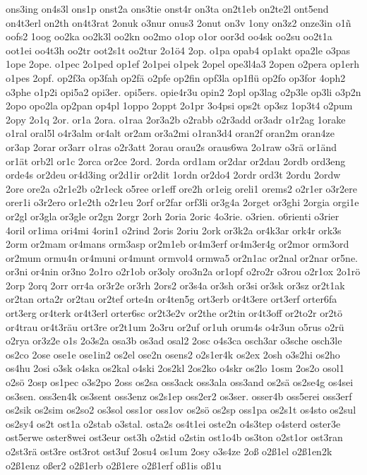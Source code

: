 {ons3ing
on4s3l
ons1p
onst2a
ons3tie
onst4r
on3ta
on2t1eb
on2te2l
ont5end
on4t3erl
on2th
on4t3rat
2onuk
o3nur
onus3
2onut
on3v
1ony
on3z2
onze3in
o1ñ
oofs2
1oog
oo2ka
oo2k3l
oo2kn
oo2mo
o1op
o1or
oor3d
oo4sk
oo2su
oo2t1a
oot1ei
oo4t3h
oo2tr
oot2s1t
oo2tur
2o1ö4
2op.
o1pa
opab4
op1akt
opa2le
o3pas
1ope
2ope.
o1pec
2o1ped
op1ef
2o1pei
o1pek
2opel
ope3l4a3
2open
o2pera
op1erh
o1pes
2opf.
op2f3a
op3fah
op2fä
o2pfe
op2fin
opf3la
op1flü
op2fo
op3for
4oph2
o3phe
o1p2i
opi5a2
opi3er.
opi5ers.
opie4r3u
opin2
2opl
op3lag
o2p3le
op3li
o3p2n
2opo
opo2la
op2pan
op4pl
1oppo
2oppt
2o1pr
3o4psi
ops2t
op3sz
1op3t4
o2pum
2opy
2o1q
2or.
or1a
2ora.
o1raa
2or3a2b
o2rabb
o2r3add
or3adr
o1r2ag
1orake
o1ral
oral5l
o4r3alm
or4alt
or2am
or3a2mi
o1ran3d4
oran2f
oran2m
oran4ze
or3ap
2orar
or3arr
o1ras
o2r3att
2orau
orau2s
oraus6wa
2o1raw
o3rä
or1änd
or1ät
orb2l
or1c
2orca
or2ce
2ord.
2orda
ord1am
or2dar
or2dau
2ordb
ord3eng
orde4s
or2deu
or4d3ing
or2d1ir
or2dit
1ordn
or2do4
2ordr
ord3t
2ordu
2ordw
2ore
ore2a
o2r1e2b
o2r1eck
o5ree
or1eff
ore2h
or1eig
oreli1
orems2
o2r1er
o3r2ere
orer1i
o3r2ero
or1e2th
o2r1eu
2orf
or2far
orf3li
or3g4a
2orget
or3ghi
2orgia
orgi1e
or2gl
or3gla
or3gle
or2gn
2orgr
2orh
2oria
2oric
4o3rie.
o3rien.
o6rienti
o3rier
4oril
or1ima
ori4mi
4orin1
o2rind
2oris
2oriu
2ork
or3k2a
or4k3ar
ork4r
ork3s
2orm
or2mam
or4mans
orm3asp
or2m1eb
or4m3erf
or4m3er4g
or2mor
orm3ord
or2mum
ormu4n
or4muni
or4munt
ormvol4
ormwa5
or2n1ac
or2nal
or2nar
or5ne.
or3ni
or4nin
or3no
2o1ro
o2r1ob
or3oly
oro3n2a
or1opf
o2ro2r
o3rou
o2r1ox
2o1rö
2orp
2orq
2orr
orr4a
or3r2e
or3rh
2ors2
or3s4a
or3sh
or3si
or3sk
or3sz
or2t1ak
or2tan
orta2r
or2tau
or2tef
orte4n
or4ten5g
ort3erb
or4t3ere
ort3erf
orter6fa
ort3erg
or4terk
or4t3erl
orter6sc
or2t3e2v
or2the
or2tin
or4t3off
or2to2r
or2tö
or4trau
or4t3räu
ort3re
or2t1um
2o3ru
or2uf
or1uh
orum4s
o4r3un
o5rus
o2rü
o2rya
or3z2e
o1s
2o3s2a
osa3b
os3ad
osal2
2osc
o4s3ca
osch3ar
o3sche
osch3le
os2co
2ose
ose1e
ose1in2
os2el
ose2n
osens2
o2s1er4k
os2ex
2osh
o3s2hi
os2ho
os4hu
2osi
o3sk
o4ska
os2kal
o4ski
2os2kl
2os2ko
o4skr
os2lo
1osm
2os2o
osol1
o2sö
2osp
os1pec
o3s2po
2oss
os2sa
oss3ack
oss3ala
oss3and
os2sä
os2se4g
os4sei
os3sen.
oss3en4k
os3sent
oss3enz
os2s1ep
oss2er2
os3ser.
osser4b
oss5erei
oss3erf
os2sik
os2sim
os2so2
os3sol
oss1or
oss1ov
os2sö
os2sp
oss1pa
os2s1t
os4sto
os2sul
os2sy4
os2t
ost1a
o2stab
o3stal.
osta2s
os4t1ei
oste2n
o4s3tep
o4sterd
oster3e
ost5erwe
oster8wei
ost3eur
ost3h
o2stid
o2stin
ost1o4b
os3ton
o2st1or
ost3ran
o2st3rä
ost3re
ost3rot
ost3uf
2osu4
os1um
2osy
o3s4ze
2oß
o2ß1el
o2ß1en2k
o2ß1enz
oßer2
o2ß1erb
o2ß1ere
o2ß1erf
oß1is
oß1u
}
